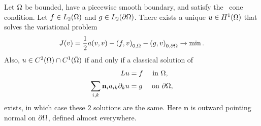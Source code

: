 \begin{thmx}{\quad}
   Let $\Omega$  be bounded, have a piecewise smooth boundary, and satisfy the~\label{thm:neumann_solution_existence}
   cone condition. Let $f \in L_2( \Omega)$ and $g\in L_2(\partial \Omega)$.
   There exists a unique $u \in H^1(\Omega)$ that solves the variational problem 
   \begin{equation*}
    J(v) = \frac{1}{2}a(v,v) - {(f,v)}_{0,\Omega} - {(g,v)}_{0,\partial\Omega} \to \min.
   \end{equation*}
   Also, $u \in C^2(\Omega)\cap C^1(\bar{\Omega})$ if and only if a classical solution 
   of 
   \begin{align}
    Lu &= f \quad \text{ in }\Omega, \nonumber \\
    \sum_{i,k}  \mathbf{n}_i a_{ik} \partial_k u &= g \quad \text{ on } \partial \Omega, \label{eq:neuman_condition_boundary}
   \end{align}
   exists, in which case these $2$ solutions are the same. Here $\mathbf{n}$ is outward 
   pointing normal on $\partial \Omega$, defined almost everywhere.
\end{thmx}
